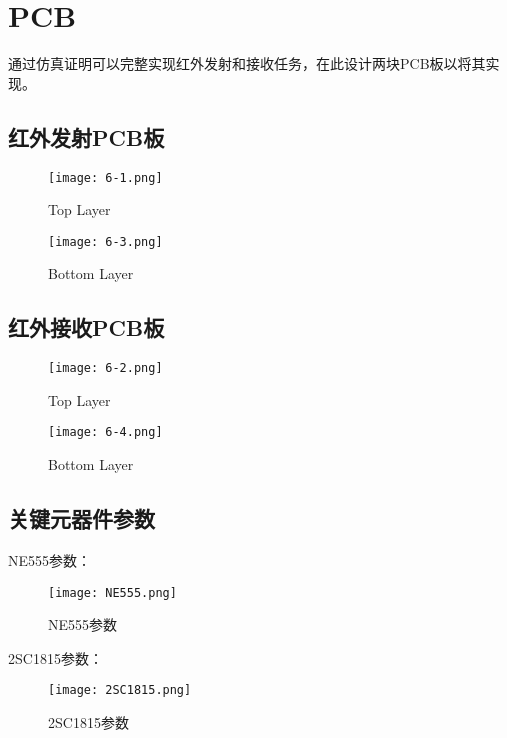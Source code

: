 \chapter{PCB}
\label{cha:intro}
通过仿真证明可以完整实现红外发射和接收任务，在此设计两块PCB板以将其实现。

\section{红外发射PCB板}
\begin{figure}[H] %
    \centering
    \texttt{[image: 6-1.png]}
    \caption{Top Layer}
    \label{fig:xfig1}
\end{figure}

\begin{figure}[H] %
    \centering
    \texttt{[image: 6-3.png]}
    \caption{Bottom Layer}
    \label{fig:xfig1}
 \end{figure}

 \section{红外接收PCB板}
 \begin{figure}[H] %
     \centering
     \texttt{[image: 6-2.png]}
     \caption{Top Layer}
     \label{fig:xfig1}
 \end{figure}
 
 \begin{figure}[H] %
     \centering
     \texttt{[image: 6-4.png]}
     \caption{Bottom Layer}
     \label{fig:xfig1}
  \end{figure}

\vspace{100pt}

\section{关键元器件参数}
NE555参数：
\begin{figure}[H] %
    \centering
    \texttt{[image: NE555.png]}
    \caption{NE555参数}
    \label{fig:xfig1}
 \end{figure}
 
2SC1815参数：
 \begin{figure}[H] %
     \centering
     \texttt{[image: 2SC1815.png]}
     \caption{2SC1815参数}
     \label{fig:xfig1}
  \end{figure}


